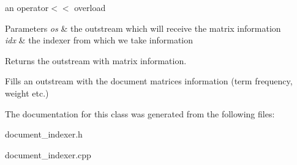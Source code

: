 an operator$<$$<$ overload 


\begin{DoxyParams}{Parameters}
{\em os} & the outstream which will receive the matrix information \\
\hline
{\em idx} & the indexer from which we take information \\
\hline
\end{DoxyParams}
\begin{DoxyReturn}{Returns}
the outstream with matrix information.
\end{DoxyReturn}
Fills an outstream with the document matrices information (term frequency, weight etc.) 

The documentation for this class was generated from the following files\+:\begin{DoxyCompactItemize}
\item 
document\+\_\+indexer.\+h\item 
document\+\_\+indexer.\+cpp\end{DoxyCompactItemize}
